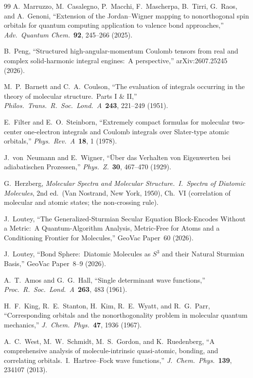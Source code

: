 \documentclass[aps,pra,twocolumn,superscriptaddress,longbibliography]{revtex4-2}
\begin{document}
\begin{thebibliography}{99}
A.~Marruzzo, M.~Casalegno, P.~Macchi, F.~Mascherpa, B.~Tirri, G.~Raos, and
A.~Genoni, ``Extension of the Jordan--Wigner mapping to nonorthogonal spin
orbitals for quantum computing application to valence bond approaches,''
\textit{Adv.\ Quantum Chem.}\ \textbf{92}, 245--266 (2025).

B.~Peng, ``Structured high-angular-momentum Coulomb tensors from real and
complex solid-harmonic integral engines:\ A perspective,''
arXiv:2607.25245 (2026).

M.~P.~Barnett and C.~A.~Coulson, ``The evaluation of integrals occurring
in the theory of molecular structure.\ Parts I \& II,''
\textit{Philos.\ Trans.\ R.\ Soc.\ Lond.\ A}\ \textbf{243}, 221--249 (1951).

E.~Filter and E.~O.~Steinborn, ``Extremely compact formulas for molecular
two-center one-electron integrals and Coulomb integrals over Slater-type
atomic orbitals,'' \textit{Phys.\ Rev.\ A}\ \textbf{18}, 1 (1978).

J.~von~Neumann and E.~Wigner, ``\"Uber das Verhalten von Eigenwerten
bei adiabatischen Prozessen,'' \textit{Phys.\ Z.}\ \textbf{30},
467--470 (1929).

G.~Herzberg, \textit{Molecular Spectra and Molecular Structure.\ I.\
Spectra of Diatomic Molecules}, 2nd ed.\ (Van Nostrand, New York, 1950),
Ch.~VI (correlation of molecular and atomic states; the non-crossing
rule).

J.~Loutey, ``The Generalized-Sturmian Secular Equation Block-Encodes
Without a Metric:\ A Quantum-Algorithm Analysis, Metric-Free for Atoms
and a Conditioning Frontier for Molecules,'' GeoVac Paper~60 (2026).

J.~Loutey, ``Bond Sphere:\ Diatomic Molecules as $S^3$ and their Natural
Sturmian Basis,'' GeoVac Paper~8--9 (2026).

A.~T.~Amos and G.~G.~Hall, ``Single determinant wave functions,''
\textit{Proc.\ R.\ Soc.\ Lond.\ A}\ \textbf{263}, 483 (1961).

H.~F.~King, R.~E.~Stanton, H.~Kim, R.~E.~Wyatt, and R.~G.~Parr,
``Corresponding orbitals and the nonorthogonality problem in molecular
quantum mechanics,'' \textit{J.\ Chem.\ Phys.}\ \textbf{47}, 1936 (1967).

A.~C.~West, M.~W.~Schmidt, M.~S.~Gordon, and K.~Ruedenberg, ``A
comprehensive analysis of molecule-intrinsic quasi-atomic, bonding, and
correlating orbitals.\ I.\ Hartree--Fock wave functions,''
\textit{J.\ Chem.\ Phys.}\ \textbf{139}, 234107 (2013).


\end{thebibliography}
\end{document}

